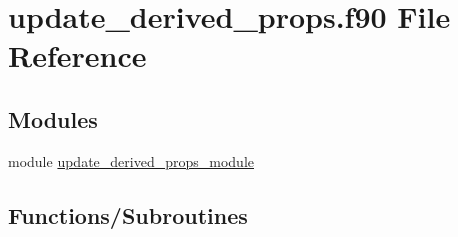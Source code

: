 \hypertarget{update__derived__props_8f90}{}\section{update\+\_\+derived\+\_\+props.\+f90 File Reference}
\label{update__derived__props_8f90}
\subsection*{Modules}
\begin{DoxyCompactItemize}
\item 
module \hyperlink{namespaceupdate__derived__props__module}{update\+\_\+derived\+\_\+props\+\_\+module}
\end{DoxyCompactItemize}
\subsection*{Functions/\+Subroutines}
